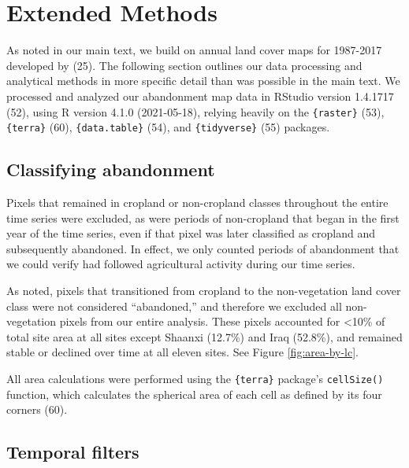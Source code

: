 \documentclass[9pt,twocolumn,twoside,lineno]{pnas-new}
\begin{document}
\newpage

\hypertarget{methods-si}{%
\section{Extended Methods}\label{methods-si}}

As noted in our main text, we build on annual land cover maps for 1987-2017 developed by (25).
The following section outlines our data processing and analytical methods in more specific detail than was possible in the main text.
We processed and analyzed our abandonment map data in RStudio version 1.4.1717 (52), using R version 4.1.0 (2021-05-18), relying heavily on the \texttt{\{raster\}} (53), \texttt{\{terra\}} (60), \texttt{\{data.table\}} (54), and \texttt{\{tidyverse\}} (55) packages.

\hypertarget{classifying-abandonment}{%
\subsection{Classifying abandonment}\label{classifying-abandonment}}

Pixels that remained in cropland or non-cropland classes throughout the entire time series were excluded, as were periods of non-cropland that began in the first year of the time series, even if that pixel was later classified as cropland and subsequently abandoned.
In effect, we only counted periods of abandonment that we could verify had followed agricultural activity during our time series.

As noted, pixels that transitioned from cropland to the non-vegetation land cover class were not considered ``abandoned,'' and therefore we excluded all non-vegetation pixels from our entire analysis.
These pixels accounted for \textless10\% of total site area at all sites except Shaanxi (12.7\%) and Iraq (52.8\%), and remained stable or declined over time at all eleven sites.
See Figure \ref{fig:area-by-lc}.

All area calculations were performed using the \texttt{\{terra\}} package's \texttt{cellSize()} function, which calculates the spherical area of each cell as defined by its four corners (60).

\hypertarget{temporal-filters}{%
\subsection{Temporal filters}\label{temporal-filters}}
\end{document}

